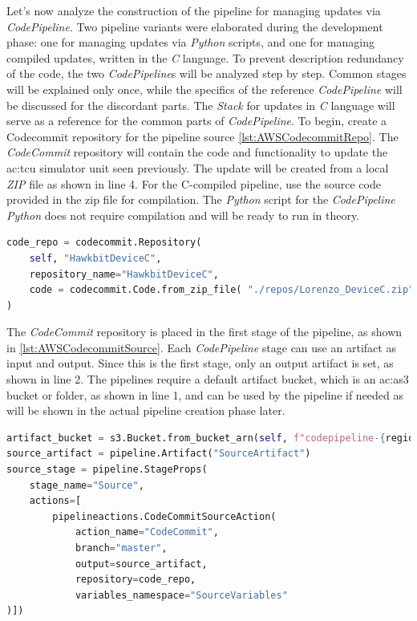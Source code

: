 Let's now analyze the construction of the pipeline for managing updates via \textit{\textit{CodePipeline}}. Two pipeline variants were elaborated during the development phase: one for managing updates via \textit{Python} scripts, and one for managing compiled updates, written in the \textit{C} language. To prevent description redundancy of the code, the two \textit{CodePipeline}s will be analyzed step by step. Common stages will be explained only once, while the specifics of the reference \textit{CodePipeline} will be discussed for the discordant parts. The \textit{Stack} for updates in \textit{C} language will serve as a reference for the common parts of \textit{CodePipeline}.
To begin, create a Codecommit repository for the pipeline source \ref{lst:AWSCodecommitRepo}. The \textit{CodeCommit} repository will contain the code and functionality to update the \gls{ac:tcu} simulator unit seen previously. The update will be created from a local \textit{ZIP} file as shown in line 4. For the C-compiled pipeline, use the source code provided in the zip file for compilation. The \textit{Python} script for the \textit{CodePipeline} \textit{Python} does not require compilation and will be ready to run in theory.
\begin{lstlisting}[language=Python, caption={CDK Code for the creation of the TCU simulator \textit{CodeCommit} repository}, label=lst:AWSCodecommitRepo]
code_repo = codecommit.Repository(
    self, "HawkbitDeviceC",
    repository_name="HawkbitDeviceC",
    code = codecommit.Code.from_zip_file( "./repos/Lorenzo_DeviceC.zip", "master" ) # Copies files from app directory to the repo as the initial commit
)
\end{lstlisting}

The \textit{CodeCommit} repository is placed in the first stage of the pipeline, as shown in \ref{lst:AWSCodecommitSource}. Each \textit{CodePipeline} stage can use an artifact as input and output. Since this is the first stage, only an output artifact is set, as shown in line 2. The pipelines require a default artifact bucket, which is an \gls{ac:as3} bucket or folder, as shown in line 1, and can be used by the pipeline if needed as will be shown in the actual pipeline creation phase later.
\begin{lstlisting}[language=Python, caption={CDK Code for the CodeCommit source stage set up}, label=lst:AWSCodecommitSource]
artifact_bucket = s3.Bucket.from_bucket_arn(self, f"codepipeline-{region}-****", f"arn:aws:s3:::codepipeline-{region}-****") #default codepipeline bucket
source_artifact = pipeline.Artifact("SourceArtifact")
source_stage = pipeline.StageProps(
    stage_name="Source",
    actions=[
        pipelineactions.CodeCommitSourceAction(
            action_name="CodeCommit",
            branch="master",
            output=source_artifact,
            repository=code_repo,
            variables_namespace="SourceVariables"
)])
\end{lstlisting}

